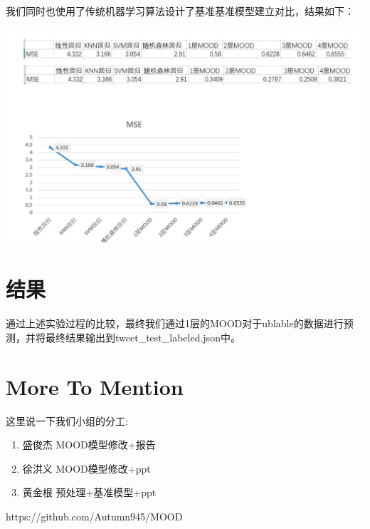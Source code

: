 \documentclass[a4paper, 12pt]{ctexart}
\begin{document}
我们同时也使用了传统机器学习算法设计了基准基准模型建立对比，结果如下：

\includegraphics[width=6inc]{tweet_pics/1}

\section{结果}
通过上述实验过程的比较，最终我们通过1层的MOOD对于ublable的数据进行预测，并将最终结果输出到tweet\_test\_labeled.json中。
\section{More To Mention}
这里说一下我们小组的分工:
\begin{enumerate}
	\item 盛俊杰 MOOD模型修改+报告
	\item 徐洪义 MOOD模型修改+ppt
	\item 黄金根 预处理+基准模型+ppt
\end{enumerate}
\renewcommand{\refname}{Reference}
\begin{thebibliography}{9}
     https://github.com/Autumn945/MOOD
    \end{thebibliography}
\end{document}
